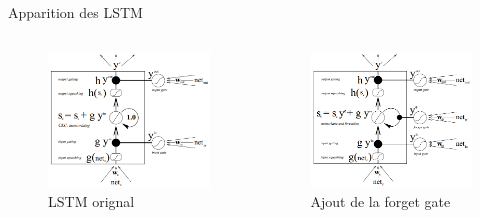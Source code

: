\begin{frame}{Apparition des LSTM}
    \begin{columns}
        \begin{column}{0.48\textwidth}
            \begin{figure}
                \includegraphics[width=.7\textwidth]{images/lstm1}
                \caption{LSTM orignal}
                \label{lstm1}
            \end{figure}
        \end{column}
        \begin{column}{0.48\textwidth}
            \begin{figure}
                \includegraphics[width=.7\textwidth]{images/lstm2}
                \caption{Ajout de la \og forget gate\fg{}}
                \label{lstm2}
            \end{figure}
        \end{column}
    \end{columns}
\end{frame}

